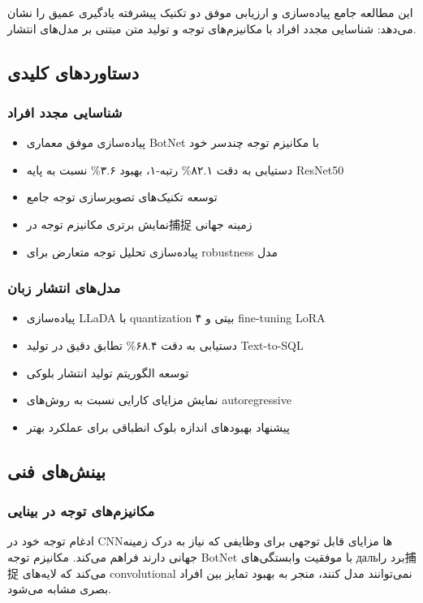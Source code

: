 \documentclass[12pt,a4paper]{article}
\theoremstyle{definition}
\begin{document}
این مطالعه جامع پیاده‌سازی و ارزیابی موفق دو تکنیک پیشرفته یادگیری عمیق را نشان می‌دهد: شناسایی مجدد افراد با مکانیزم‌های توجه و تولید متن مبتنی بر مدل‌های انتشار.

\subsection{دستاوردهای کلیدی}

\subsubsection*{شناسایی مجدد افراد}
\begin{itemize}
    \item پیاده‌سازی موفق معماری BotNet با مکانیزم توجه چندسر خود
    \item دستیابی به دقت ۸۲.۱\% رتبه-۱، بهبود ۳.۶\% نسبت به پایه ResNet50
    \item توسعه تکنیک‌های تصویرسازی توجه جامع
    \item نمایش برتری مکانیزم توجه در捕捉 زمینه جهانی
    \item پیاده‌سازی تحلیل توجه متعارض برای robustness مدل
\end{itemize}

\subsubsection*{مدل‌های انتشار زبان}
\begin{itemize}
    \item پیاده‌سازی LLaDA با quantization ۴ بیتی و fine-tuning LoRA
    \item دستیابی به دقت ۶۸.۴\% تطابق دقیق در تولید Text-to-SQL
    \item توسعه الگوریتم تولید انتشار بلوکی
    \item نمایش مزایای کارایی نسبت به روش‌های autoregressive
    \item پیشنهاد بهبودهای اندازه بلوک انطباقی برای عملکرد بهتر
\end{itemize}

\subsection{بینش‌های فنی}

\subsubsection*{مکانیزم‌های توجه در بینایی}
ادغام توجه خود در CNNها مزایای قابل توجهی برای وظایفی که نیاز به درک زمینه جهانی دارند فراهم می‌کند. مکانیزم توجه BotNet با موفقیت وابستگی‌های дальبرد را捕捉 می‌کند که لایه‌های convolutional نمی‌توانند مدل کنند، منجر به بهبود تمایز بین افراد بصری مشابه می‌شود.
\end{document}
